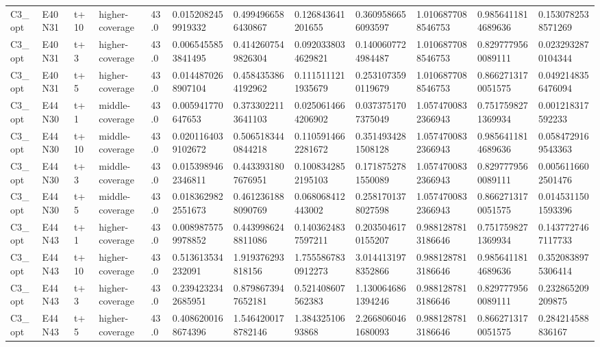 \begin{landscape}
\begin{longtable}{llllllllllll}
C3\_opt & E40N31 & t+10 & higher-coverage & 43.0 & 0.0152082459919332 & 0.4994966586430867 & 0.126843641201655 & 0.3609586656093597 & 1.0106877088546753 & 0.9856411814689636 & 0.1530782538571269 \\
C3\_opt & E40N31 & t+3 & higher-coverage & 43.0 & 0.0065455853841495 & 0.4142607549826304 & 0.0920338034629821 & 0.1400607724984487 & 1.0106877088546753 & 0.8297779560089111 & 0.0232932870104344 \\
C3\_opt & E40N31 & t+5 & higher-coverage & 43.0 & 0.0144870268907104 & 0.4584353864192962 & 0.1115111211935679 & 0.2531073590119679 & 1.0106877088546753 & 0.8662713170051575 & 0.0492148356476094 \\
C3\_opt & E44N30 & t+1 & middle-coverage & 43.0 & 0.005941770647653 & 0.3733022113641103 & 0.0250614664206902 & 0.0373751707375049 & 1.0574700832366943 & 0.7517598271369934 & 0.001218317592233 \\
C3\_opt & E44N30 & t+10 & middle-coverage & 43.0 & 0.0201164039102672 & 0.5065183440844218 & 0.1105914662281672 & 0.3514934281508128 & 1.0574700832366943 & 0.9856411814689636 & 0.0584729169543363 \\
C3\_opt & E44N30 & t+3 & middle-coverage & 43.0 & 0.0153989462346811 & 0.4433931807676951 & 0.1008342852195103 & 0.1718752781550089 & 1.0574700832366943 & 0.8297779560089111 & 0.0056116602501476 \\
C3\_opt & E44N30 & t+5 & middle-coverage & 43.0 & 0.0183629822551673 & 0.4612361888090769 & 0.068068412443002 & 0.2581701378027598 & 1.0574700832366943 & 0.8662713170051575 & 0.0145311501593396 \\
C3\_opt & E44N43 & t+1 & higher-coverage & 43.0 & 0.0089875759978852 & 0.4439986248811086 & 0.1403624837597211 & 0.2035046170155207 & 0.9881287813186646 & 0.7517598271369934 & 0.1437727467117733 \\
C3\_opt & E44N43 & t+10 & higher-coverage & 43.0 & 0.513613534232091 & 1.919376293818156 & 1.7555867830912273 & 3.0144131978352866 & 0.9881287813186646 & 0.9856411814689636 & 0.3520838975306414 \\
C3\_opt & E44N43 & t+3 & higher-coverage & 43.0 & 0.2394232342685951 & 0.8798673947652181 & 0.521408607562383 & 1.1300646861394246 & 0.9881287813186646 & 0.8297779560089111 & 0.232865209209875 \\
C3\_opt & E44N43 & t+5 & higher-coverage & 43.0 & 0.4086200168674396 & 1.5464200178782146 & 1.38432510693868 & 2.2668060461680093 & 0.9881287813186646 & 0.8662713170051575 & 0.284214588836167 \\

\end{longtable}
\end{landscape}
